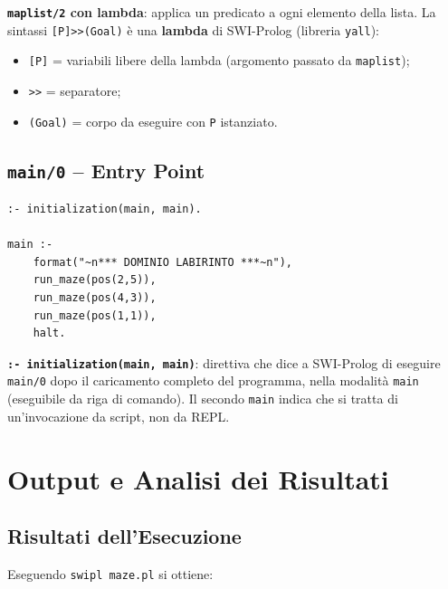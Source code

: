 \documentclass[12pt,a4paper]{article}
\begin{document}
\textbf{\texttt{maplist/2} con lambda}: applica un predicato a ogni elemento
della lista. La sintassi \texttt{[P]>>(Goal)} è una \textbf{lambda} di
SWI-Prolog (libreria \texttt{yall}):
\begin{itemize}[noitemsep]
  \item \texttt{[P]} = variabili libere della lambda (argomento passato da \texttt{maplist});
  \item \texttt{>>} = separatore;
  \item \texttt{(Goal)} = corpo da eseguire con \texttt{P} istanziato.
\end{itemize}

\subsection{\texttt{main/0} -- Entry Point}

\begin{lstlisting}
:- initialization(main, main).

main :-
    format("~n*** DOMINIO LABIRINTO ***~n"),
    run_maze(pos(2,5)),
    run_maze(pos(4,3)),
    run_maze(pos(1,1)),
    halt.
\end{lstlisting}

\textbf{\texttt{:- initialization(main, main)}}: direttiva che dice a SWI-Prolog
di eseguire \texttt{main/0} dopo il caricamento completo del programma, nella
modalità \texttt{main} (eseguibile da riga di comando). Il secondo \texttt{main}
indica che si tratta di un'invocazione da script, non da REPL.

\section{Output e Analisi dei Risultati}

\subsection{Risultati dell'Esecuzione}

Eseguendo \texttt{swipl maze.pl} si ottiene:
\end{document}
